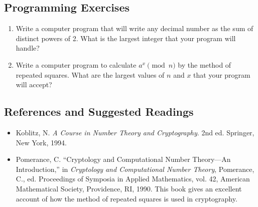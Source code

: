  
\subsection*{Programming Exercises}
 
 
{\small
\begin{enumerate}
 
 
\item
Write a computer program that will write any decimal number as the sum
of distinct powers of 2.  What is the largest integer that your
program will handle?
 
 
\item
Write a computer program to calculate $a^x \pmod{ n}$ by the method of
repeated squares.  What are the largest values of $n$ and $x$ that
your program will accept?  
 
 
\end{enumerate}
}
 
 
\subsection*{References and Suggested Readings}
 
 
{\small
\begin{itemize}
 
\item[{\bf [1]}] %
Koblitz, N. {\it A Course in Number Theory and Cryptography}. 2nd ed.
Springer, New York, 1994.  
 
 
\item[{\bf [2]}]
Pomerance, C. ``Cryptology and Computational Number Theory---An
Introduction,'' in {\it Cryptology and Computational Number Theory},
Pomerance, C., ed. Proceedings of Symposia in Applied Mathematics,
vol. 42, American Mathematical Society, Providence, RI, 1990.  This
book gives an excellent account of how the method of repeated squares
is used in cryptography. 
 
\end{itemize}
}
 
 
 
